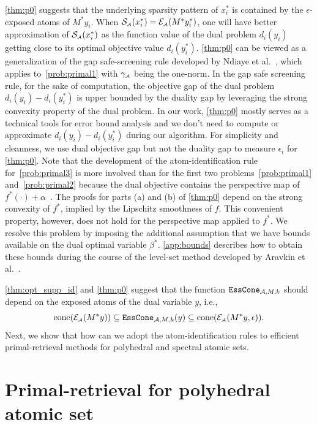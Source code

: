 \autoref{thm:p0} suggests that the underlying sparsity pattern of $x_i^*$ is contained by the $\epsilon$-exposed atoms of $M^* y_i$. When $\operatorname{\mathcal{S}_{\scriptscriptstyle\mathcal{A}}}(x_i^*) = \mathcal{E}_{\scriptscriptstyle\mathcal{A}}(M^* y_i^*)$, one will have better approximation of $\operatorname{\mathcal{S}_{\scriptscriptstyle\mathcal{A}}}(x_i^*)$ as the function value of the dual problem $d_i(y_i)$ getting close to its optimal objective value $d_i(y_i^*)$. \autoref{thm:p0} can be viewed as a generalization of the gap safe-screening rule developed by Ndiaye et al.~\cite{NdiayeFGS17}, which applies to~\eqref{prob:primal1} with $\gamma_{\scriptscriptstyle\mathcal{A}}$ being the one-norm. In the gap safe screening rule, for the sake of computation, the objective gap of the dual problem $d_i(y_i) - d_i(y_i^*)$ is upper bounded by the duality gap by leveraging the strong convexity property of the dual problem. In our work, \autoref{thm:p0} mostly serves as a technical tools for error bound analysis and we don't need to compute or approximate $d_i(y_i) - d_i(y_i^*)$ during our algorithm. For simplicity and cleanness, we use dual objective gap but not the duality gap to measure $\epsilon_i$ for \autoref{thm:p0}. Note that the development of the atom-identification rule for~\eqref{prob:primal3} is more involved than for the first two problems~\eqref{prob:primal1} and~\eqref{prob:primal2} because the dual objective contains the perspective map of $f^*(\cdot) + \alpha$~\cite{aravkin2018foundations}. The proofs for parts (a) and (b) of \autoref{thm:p0} depend on the strong convexity of $f^*$, implied by the Lipschitz smoothness of $f$. This convenient property, however, does not hold for the perspective map applied to $f^*$. We resolve this problem by imposing the additional assumption that we have bounds available on the dual optimal variable $\beta^*$. \autoref{app:bounds} describes how to obtain these bounds during the course of the level-set method developed by Aravkin et al.~\cite{aravkin2016levelset}.

\autoref{thm:opt_supp_id} and \autoref{thm:p0} suggest that the function $\texttt{EssCone}_{\mathcal{A}, M, k}$ should depend on the exposed atoms of the dual variable $y$, i.e., 
\[\operatorname{cone}(\mathcal{E}_{\scriptscriptstyle\mathcal{A}}(M^*y)) \subseteq \texttt{EssCone}_{\mathcal{A}, M, k}(y) \subseteq \operatorname{cone}(\mathcal{E}_{\scriptscriptstyle\mathcal{A}}(M^*y, \epsilon)).\]
Next, we show that how can we adopt the atom-identification rules to efficient primal-retrieval methods for polyhedral and spectral atomic sets. 

\section{Primal-retrieval for polyhedral atomic set} \label{sec:polyhedral}

